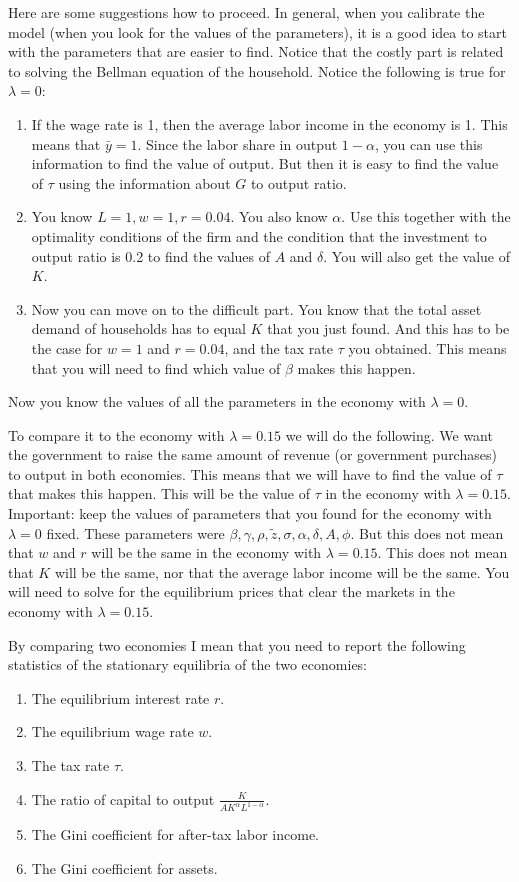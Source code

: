 \documentclass[english,hyperref={pdftex,pdfpagemode=UseNone,hidelinks}]{tufte-handout}
\begin{document}
Here are some suggestions how to proceed. In general, when you calibrate the model (when you look for the values of the parameters), it is a good idea to start with the parameters that are easier to find. Notice that the costly part is related to solving the Bellman equation of the household. Notice the following is true for $\lambda = 0$:
\begin{enumerate}
    \item If the wage rate is 1, then the average labor income in the economy is 1. This means that $\bar{y} = 1$. Since the labor share in output $1-\alpha$, you can use this information to find the value of output. But then it is easy to find the value of $\tau$ using the information about $G$ to output ratio.
    \item You know $L=1, w = 1, r = 0.04$. You also know $\alpha$. Use this together with the optimality conditions of the firm and the condition that the investment to output ratio is 0.2 to find the values of $A$ and $\delta$. You will also get the value of $K$.
    \item Now you can move on to the difficult part. You know that the total asset demand of households has to equal $K$ that you just found. And this has to be the case for $w=1$ and $r=0.04$, and the tax rate $\tau$ you obtained. This means that you will need to find which value of $\beta$ makes this happen.
\end{enumerate}


Now you know the values of all the parameters in the economy with $\lambda=0$. 

To compare it to the economy with $\lambda=0.15$ we will do the following. We want the government to raise the same amount of revenue (or government purchases) to output in both economies. This means that we will have to find the value of $\tau$ that makes this happen. This will be the value of $\tau$ in the economy with $\lambda=0.15$. Important: keep the values of parameters that you found for the economy with $\lambda=0$ fixed. These parameters were $\beta,\gamma,\rho,\tilde{z},\sigma,\alpha,\delta,A,\phi$.  But this does not mean that $w$ and $r$ will be the same in the economy with $\lambda=0.15$. This does not mean that $K$ will be the same, nor that the average labor income will be the same. You will need to solve for the equilibrium prices that clear the markets in the economy with $\lambda=0.15$.

By comparing two economies I mean that you need to report the following statistics of the stationary equilibria of the two economies: \begin{enumerate}
    \item The equilibrium interest rate $r$.
    \item The equilibrium wage rate $w$.
    \item The tax rate $\tau$.
    \item The ratio of capital to output $\frac{K}{A K^\alpha L^{1-\alpha}}$.
    \item The Gini coefficient for after-tax labor income.
    \item The Gini coefficient for assets. 
\end{enumerate}
\end{document}
